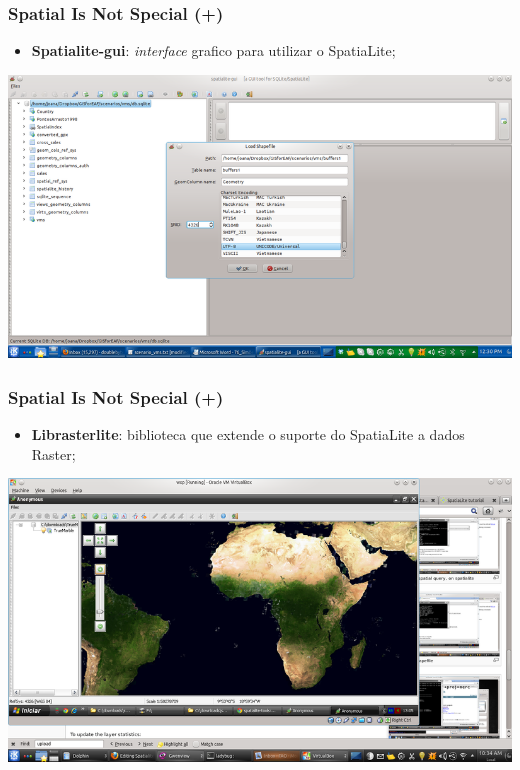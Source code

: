 \documentclass[hyperref={pdfpagelabels=true}]{beamer}
\begin{document}
\begin{frame}
\frametitle{Spatial Is Not Special (+)}
    \begin{itemize}
      \item<1-> \textbf{Spatialite-gui}: \textit{interface} grafico para utilizar o SpatiaLite;
    \end{itemize}
  \includegraphics[scale=0.4]{spatialite_gui.png}        
\end{frame}

\begin{frame}
\frametitle{Spatial Is Not Special (+)}
    \begin{itemize}
      \item<1-> \textbf{Librasterlite}: biblioteca que extende o suporte do SpatiaLite a dados Raster;
    \end{itemize}
  \includegraphics[scale=0.4]{rasterlite.png}        
\end{frame}
\end{document}
